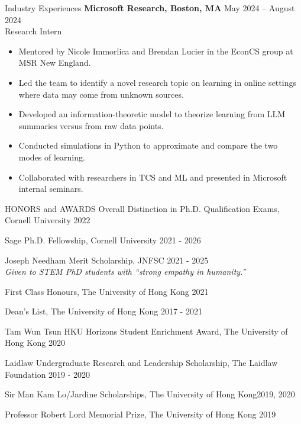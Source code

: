 \documentclass{resume} %
\begin{document}
\begin{rSection}{Industry Experiences}
  {\bf Microsoft Research, Boston, MA} \hfill {May 2024 -- August 2024} \\
  Research Intern \vspace{-0.5em}
  \begin{itemize}
    \itemsep-0.5em 
    \item Mentored by Nicole Immorlica and Brendan Lucier in the EconCS group at MSR New England.
    \item Led the team to identify a novel research topic on learning in online settings where data may come from unknown sources.
    \item Developed an information-theoretic model to theorize learning from LLM summaries versus from raw data points.
    \item Conducted simulations in Python to approximate and compare the two modes of learning.
    \item Collaborated with researchers in TCS and ML and presented in Microsoft internal seminars.
  \end{itemize} 
  
\end{rSection}

\begin{rSection}{HONORS and AWARDS}
Overall Distinction in Ph.D. Qualification Exams, Cornell University \hfill 2022

Sage Ph.D. Fellowship, Cornell University \hfill 2021 - 2026

Joseph Needham Merit Scholarship, JNFSC \hfill 2021 - 2025 \\
\emph{Given to STEM PhD students with ``strong empathy in humanity.''}

First Class Honours, The University of Hong Kong \hfill 2021

Dean's List, The University of Hong Kong \hfill 2017 - 2021

Tam Wun Tsun HKU Horizons Student Enrichment Award, The University of Hong Kong \hfill 2020

Laidlaw Undergraduate Research and Leadership Scholarship, The Laidlaw Foundation \hfill 2019 - 2020

Sir Man Kam Lo/Jardine Scholarships, The University of Hong Kong\hfill 2019, 2020

Professor Robert Lord Memorial Prize, The University of Hong Kong \hfill 2019 

\end{rSection}
\end{document}
